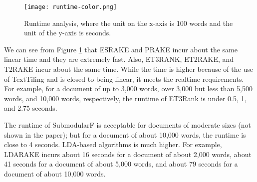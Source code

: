 \documentclass[a4paper,twoside]{article}
\begin{document}
\begin{figure}[h]
\centering
\texttt{[image: runtime-color.png]}
\caption{Runtime analysis, where the unit on the x-axis is 100 words and the unit of the y-axis is seconds.} \label{fig:runtime}
\end{figure}
We can see from Figure \ref{fig:runtime} that ESRAKE and PRAKE incur about the same linear time and they are extremely fast.
Also, ET3RANK, ET2RAKE, and T2RAKE incur about the same time. While the time is higher because of the use of TextTiling and
is closed to being linear, it meets the realtime requirements. For example, for a document of up to 3,000 words, over
3,000 but less than 5,500 words, and 10,000 words, respectively,
the runtime of ET3Rank is under 0.5, 1, and 2.75 seconds.
%

The runtime of SubmodularF is acceptable for documents of moderate sizes (not shown in the paper); but for a document of about 10,000 words, the runtime is close to 4 seconds.
LDA-based algorithms is much higher. For example, LDARAKE incurs about 16 seconds for a document of
about 2,000 words, about 41 seconds for a document of about 5,000 words, and about 79 seconds for a document of about 10,000 words.

%
\end{document}
